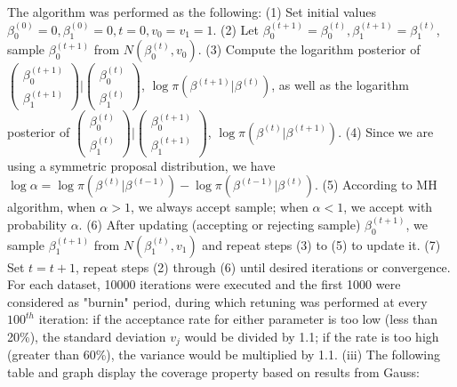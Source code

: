 \documentclass[12pt]{article}
\begin{document}
The algorithm was performed as the following: \newline
(1) Set initial values $\beta_0^{(0)} = 0, \beta_1^{(0)} = 0, t = 0, v_0 = v_1 = 1$. \newline
(2) Let $\beta_0^{(t+1)} = \beta_0^{(t)}, \beta_1^{(t+1)} = \beta_1^{(t)}$, sample $\beta_0^{(t+1)}$ from $N(\beta_0^{(t)}, v_0)$. \newline
(3) Compute the logarithm posterior of $\begin{pmatrix} \beta_0^{(t+1)} \\ \beta_1^{(t+1)} \end{pmatrix} | \begin{pmatrix} \beta_0^{(t)} \\ \beta_1^{(t)} \end{pmatrix}$, $\log \pi(\beta^{(t+1)}|\beta^{(t)})$, as well as the logarithm posterior of $\begin{pmatrix} \beta_0^{(t)} \\ \beta_1^{(t)} \end{pmatrix} | \begin{pmatrix} \beta_0^{(t+1)} \\ \beta_1^{(t+1)} \end{pmatrix}$, $\log \pi(\beta^{(t)}|\beta^{(t+1)})$. \newline
(4) Since we are using a symmetric proposal distribution, we have $\log\alpha = \log \pi(\beta^{(t)}|\beta^{(t-1)}) - \log \pi(\beta^{(t-1)}|\beta^{(t)})$.
(5) According to MH algorithm, when $\alpha > 1$, we always accept sample; when $\alpha < 1$, we accept with probability $\alpha$. \newline
(6) After updating (accepting or rejecting sample) $\beta_0^{(t+1)}$, we sample $\beta_1^{(t+1)}$ from $N(\beta_1^{(t)}, v_1)$ and repeat steps (3) to (5) to update it. \newline
(7) Set $t = t+1$, repeat steps (2) through (6) until desired iterations or convergence. \newline
For each dataset, 10000 iterations were executed and the first 1000 were considered as "burnin" period, during which retuning was performed at every $100^{th}$ iteration: if the acceptance rate for either parameter is too low (less than 20\%), the standard deviation $v_j$ would be divided by 1.1; if the rate is too high (greater than 60\%), the variance would be multiplied by 1.1. \newline
(iii) The following table and graph display the coverage property based on results from Gauss:
\end{document}
